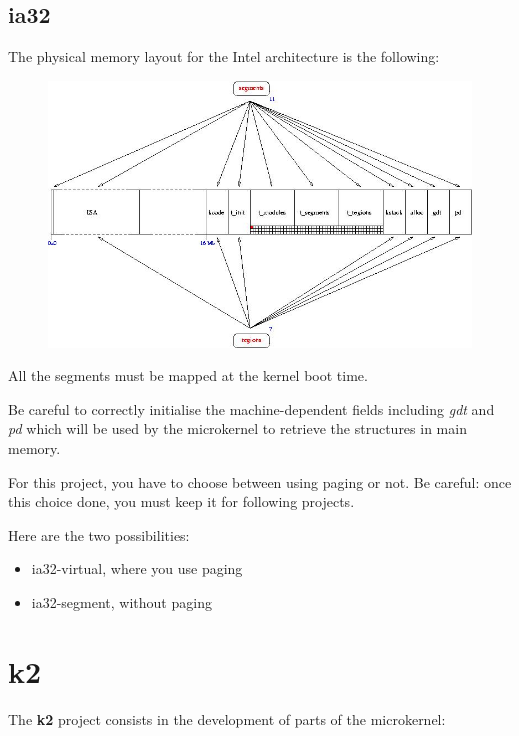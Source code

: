 %
%

\subsection{ia32}

The physical memory layout for the Intel architecture is the following:

\begin{figure}[h]
\centerline{\includegraphics[scale=0.5]{figures/k1-memory-layout.jpg}}
\end{figure}

All the segments must be mapped at the kernel boot time.

Be careful to correctly initialise the machine-dependent fields
including \textit{gdt} and \textit{pd} which will be used by the microkernel
to retrieve the structures in main memory.

For this project,  you have to choose between using  paging or not. Be
careful:  once  this choice  done,  you  must  keep it  for  following
projects.

Here are the two possibilities:

\begin{itemize}
\item ia32-virtual, where you use paging
\item ia32-segment, without paging
\end{itemize}

%
%

\section{k2}

The \textbf{k2} project consists in the development of parts of
the microkernel:

